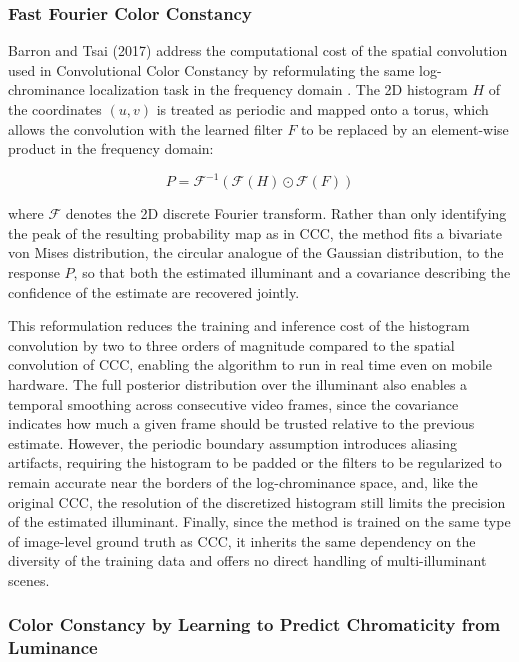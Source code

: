 \subsubsection{Fast Fourier Color Constancy}

Barron and Tsai (2017) address the computational cost of the spatial convolution used in Convolutional Color Constancy by reformulating the same log-chrominance localization task in the frequency domain \cite{barron2017fastFourier}. The 2D histogram $H$ of the coordinates $(u, v)$ is treated as periodic and mapped onto a torus, which allows the convolution with the learned filter $F$ to be replaced by an element-wise product in the frequency domain:

\begin{equation}
P = \mathcal{F}^{-1}\left(\mathcal{F}(H) \odot \mathcal{F}(F)\right)
\end{equation}

where $\mathcal{F}$ denotes the 2D discrete Fourier transform. Rather than only identifying the peak of the resulting probability map as in CCC, the method fits a bivariate von Mises distribution, the circular analogue of the Gaussian distribution, to the response $P$, so that both the estimated illuminant and a covariance describing the confidence of the estimate are recovered jointly.

This reformulation reduces the training and inference cost of the histogram convolution by two to three orders of magnitude compared to the spatial convolution of CCC, enabling the algorithm to run in real time even on mobile hardware. The full posterior distribution over the illuminant also enables a temporal smoothing across consecutive video frames, since the covariance indicates how much a given frame should be trusted relative to the previous estimate. However, the periodic boundary assumption introduces aliasing artifacts, requiring the histogram to be padded or the filters to be regularized to remain accurate near the borders of the log-chrominance space, and, like the original CCC, the resolution of the discretized histogram still limits the precision of the estimated illuminant. Finally, since the method is trained on the same type of image-level ground truth as CCC, it inherits the same dependency on the diversity of the training data and offers no direct handling of multi-illuminant scenes.

\subsubsection{Color Constancy by Learning to Predict Chromaticity from Luminance}


